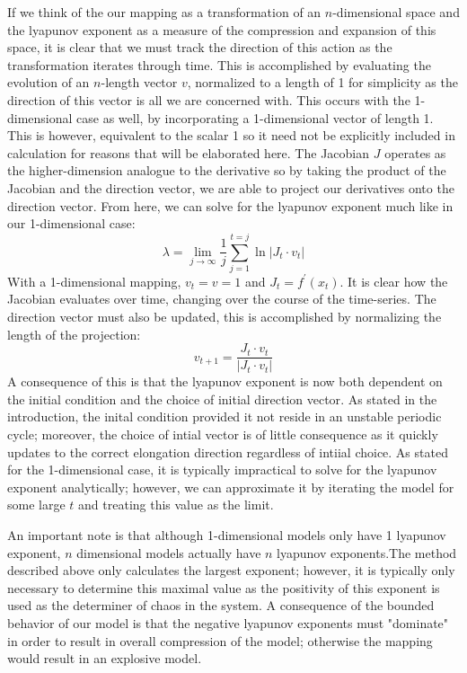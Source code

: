 If we think of the our mapping as a transformation of an $n$-dimensional space and the lyapunov exponent as a measure of the compression and expansion of this space, it is clear that we must track the direction of this action as the transformation iterates through time. This is accomplished by evaluating the evolution of an $n$-length vector $v$, normalized to a length of 1 for simplicity as the direction of this vector is all we are concerned with. This occurs with the 1-dimensional case as well, by incorporating a 1-dimensional vector of length 1. This is however, equivalent to the scalar 1 so it need not be explicitly included in calculation for reasons that will be elaborated here. The Jacobian $J$ operates as the higher-dimension analogue to the derivative so by taking the product of the Jacobian and the direction vector, we are able to project our derivatives onto the direction vector. From here, we can solve for the lyapunov exponent much like in our 1-dimensional case:
\begin{equation}
    \lambda = \lim_{j\to\infty}\frac{1}{j}\sum^{t=j}_{j=1}\ln\lvert J_t\cdot v_t\rvert
\end{equation}
With a 1-dimensional mapping, $v_t=v=1$ and $J_t=f^\prime(x_t)$. It is clear how the Jacobian evaluates over time, changing over the course of the time-series. The direction vector must also be updated, this is accomplished by normalizing the length of the projection:
\begin{equation}
    v_{t+1}=\frac{J_t\cdot v_t}{\lvert J_t\cdot v_t\rvert}
\end{equation}
A consequence of this is that the lyapunov exponent is now both dependent on the initial condition and the choice of initial direction vector\autocite{MedioAlfredo2001Ndap,Puu2003}. As stated in the introduction, the inital condition provided it not reside in an unstable periodic cycle; moreover, the choice of intial vector is of little consequence as it quickly updates to the correct elongation direction regardless of intiial choice. As stated for the 1-dimensional case, it is typically impractical to solve for the lyapunov exponent analytically; however, we can approximate it by iterating the model for some large $t$ and treating this value as the limit.

An important note is that although 1-dimensional models only have 1 lyapunov exponent, $n$ dimensional models actually have $n$ lyapunov exponents.The method described above only calculates the largest exponent; however, it is typically only necessary to determine this maximal value as the positivity of this exponent is used as the determiner of chaos in the system. A consequence of the bounded behavior of our model is that the negative lyapunov exponents must "dominate" in order to result in overall compression of the model; otherwise the mapping would result in an explosive model. 

